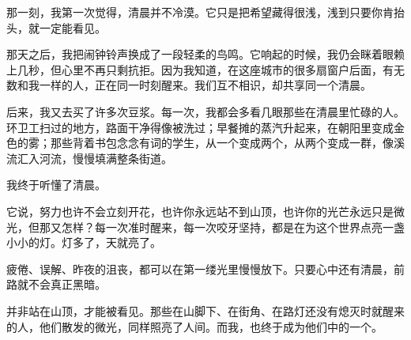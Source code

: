 那一刻，我第一次觉得，清晨并不冷漠。它只是把希望藏得很浅，浅到只要你肯抬头，就一定能看见。

那天之后，我把闹钟铃声换成了一段轻柔的鸟鸣。它响起的时候，我仍会眯着眼赖上几秒，但心里不再只剩抗拒。因为我知道，在这座城市的很多扇窗户后面，有无数和我一样的人，正在同一时刻醒来。我们互不相识，却共享同一个清晨。

后来，我又去买了许多次豆浆。每一次，我都会多看几眼那些在清晨里忙碌的人。环卫工扫过的地方，路面干净得像被洗过；早餐摊的蒸汽升起来，在朝阳里变成金色的雾；那些背着书包念念有词的学生，从一个变成两个，从两个变成一群，像溪流汇入河流，慢慢填满整条街道。

我终于听懂了清晨。

它说，努力也许不会立刻开花，也许你永远站不到山顶，也许你的光芒永远只是微光，但那又怎样？每一次准时醒来，每一次咬牙坚持，都是在为这个世界点亮一盏小小的灯。灯多了，天就亮了。

疲倦、误解、昨夜的沮丧，都可以在第一缕光里慢慢放下。只要心中还有清晨，前路就不会真正黑暗。

并非站在山顶，才能被看见。那些在山脚下、在街角、在路灯还没有熄灭时就醒来的人，他们散发的微光，同样照亮了人间。而我，也终于成为他们中的一个。
